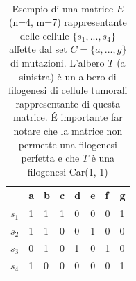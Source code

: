 \documentclass{report}
\begin{document}
\begin{table}[H]
    ~\hfill~
    \begin{minipage}{0.5\textwidth}
    \centering
      \begin{tabular}{|l|l|l|l|l|l|l|l|}
        \hline
         & a & b & c & d & e & f & g\\
        \hline
        $s_{1}$ & 1 & 1 & 1 & 0 & 0 & 0 & 1\\
        \hline
        $s_{2}$ & 1 & 1 & 0 & 0 & 1 & 0 & 0\\
        \hline
        $s_{3}$ & 0 & 1 & 0 & 1 & 0 & 1 & 0\\
        \hline
        $s_{4}$ & 1 & 0 & 0 & 0 & 0 & 0 & 1\\
        \hline
      \end{tabular}
    \end{minipage}
    \caption{Esempio di una matrice $E$ (n=4, m=7) rappresentante delle cellule $\{ s_{1},...,s_{4}\}$ affette dal set $C = \{ a,...,g\}$ di mutazioni. L'albero $T$ (a sinistra) è un albero di filogenesi di cellule tumorali rappresentante di questa matrice. \'E importante far notare che la matrice non permette una filogenesi perfetta e che $T$ è una filogenesi Car(1, 1)}
    \label{fig:fig1}
  \end{table}
\end{document}
